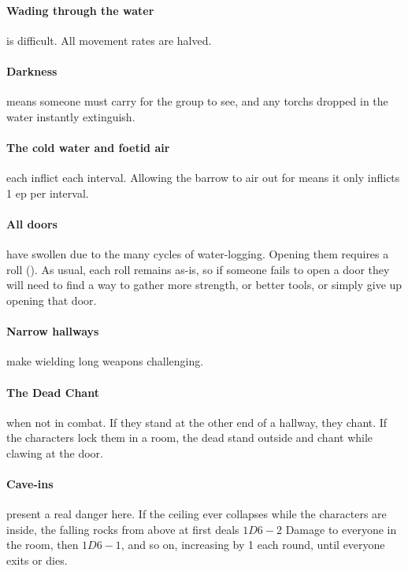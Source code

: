 \paragraph{Wading through the water}
is difficult.
All movement rates are halved.

\paragraph{Darkness}
means someone must carry  for the group to see, and any \glspl{torch} dropped in the water instantly extinguish.

\paragraph{The cold water and foetid air}
each inflict  each \gls{interval}.
Allowing the barrow to air out for  means it only inflicts 1 \gls{ep} per \gls{interval}.

\paragraph{All doors}
have swollen due to the many \glspl{cycle} of water-logging.
Opening them requires a  roll (\tn[10]).
As usual, each roll remains as-is, so if someone fails to open a door they will need to find a way to gather more strength, or better tools, or simply give up opening that door.

\paragraph{Narrow hallways}
make wielding long weapons challenging.%

\paragraph{The Dead Chant} when not in combat.
If they stand at the other end of a hallway, they chant.
If the characters lock them in a room, the dead stand outside and chant while clawing at the door.

\paragraph{Cave-ins} present a real danger here.  If the ceiling ever collapses while the characters are inside, the falling rocks from above at first deals $1D6-2$ Damage to everyone in the room, then $1D6-1$, and so on, increasing by 1 each \gls{round}, until everyone exits or dies.

